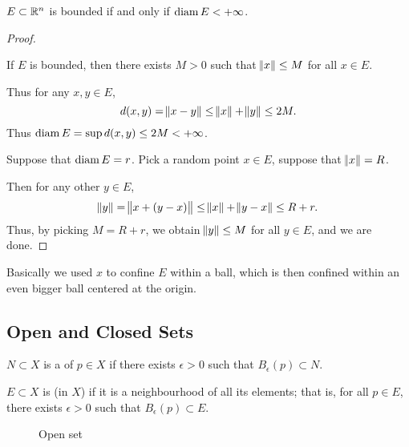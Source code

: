 \begin{proposition}
$E\subset\mathbb R^n$ is bounded if and only if $\operatorname{diam} E<+\infty$.
\end{proposition}

\begin{proof} \

\fbox{$\implies$} If $E$ is bounded, then there exists $M>0$ such that $\norm{x}\le M$ for all $x \in E$.

Thus for any $x,y \in E$,
\[ d(x,y)=\norm{x-y}\le\norm{x}+\norm{y}\le2M. \]
Thus $\operatorname{diam} E = \sup d(x,y) \le 2M<+\infty$.

\fbox{$\impliedby$} Suppose that $\operatorname{diam} E=r$. Pick a random point $x\in E$, suppose that $\norm{x}=R$.

Then for any other $y \in E$,
\[ \norm{y}=\norm{x+(y-x)}\le\norm{x}+\norm{y-x}\le R+r. \]
Thus, by picking $M=R+r$, we obtain $\norm{y}\le M$ for all $y \in E$, and we are done.
\end{proof}

\begin{remark}
Basically we used $x$ to confine $E$ within a ball, which is then confined within an even bigger ball centered at the origin.
\end{remark}

\subsection{Open and Closed Sets}
\begin{definition}[Neighbourhood]
$N\subset X$ is a  of $p\in X$ if there exists $\epsilon>0$ such that $B_\epsilon(p)\subset N$.
\end{definition}

\begin{definition}
$E\subset X$ is  (in $X$) if it is a neighbourhood of all its elements; that is, for all $p\in E$, there exists $\epsilon>0$ such that $B_\epsilon(p)\subset E$.
\end{definition}

\begin{figure}[H]
\centering
{}
\caption{Open set}
\end{figure}

